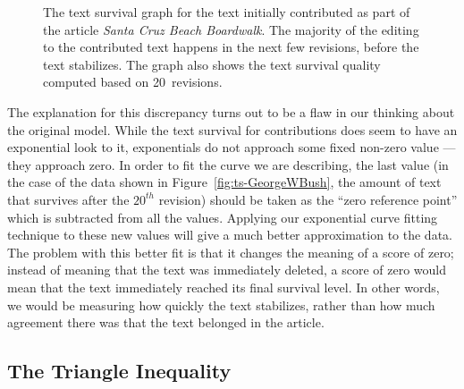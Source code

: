 \begin{figure}[tbph]
\centering
{}
\caption{The text survival graph for the text initially contributed
	as part of the article \textit{Santa Cruz Beach Boardwalk}.
	The majority of the editing to the contributed text happens
	in the next few revisions, before the text stabilizes.
	The graph also shows the text survival quality
	computed based on 20~revisions.
	}
\label{fig:ts-SantaCruzBeachBoardwalk}
\end{figure}

The explanation for this discrepancy turns out to be a flaw in our
thinking about the original model.
While the text survival for contributions does seem to have an
exponential look to it, exponentials do not approach some fixed
non-zero value --- they approach zero.
In order to fit the curve we are describing, the last value
(in the case of the data shown in Figure~\ref{fig:ts-GeorgeWBush},
the amount of text that survives after the $20^{th}$ revision)
should be taken as the ``zero reference point'' which is subtracted
from all the values.
Applying our exponential curve fitting technique to these new values
will give a much better approximation to the data.
The problem with this better fit is that it changes the meaning of
a score of zero; instead of meaning that the text was immediately deleted,
a score of zero would mean that the text immediately reached its
final survival level.
In other words, we would be measuring how quickly the text stabilizes,
rather than how much agreement there was that the text belonged in
the article.

\subsection{The Triangle Inequality}


